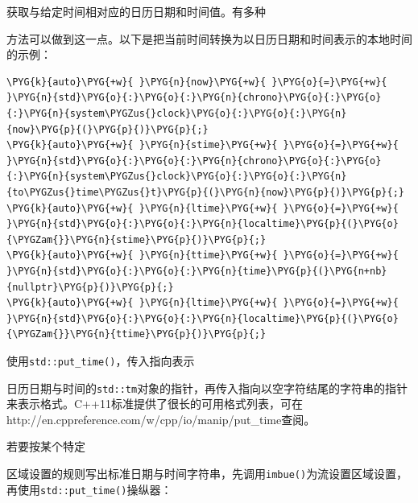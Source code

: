 
获取与给定时间相对应的日历日期和时间值。有多种



方法可以做到这一点。以下是把当前时间转换为以日历日期和时间表示的本地时间的示例：


\begin{codeblockbg}
\begin{Verbatim}[commandchars=\\\{\},breaklines=true,breakanywhere=true,fontsize=\codefont,xleftmargin=17bp]
\PYG{k}{auto}\PYG{+w}{ }\PYG{n}{now}\PYG{+w}{ }\PYG{o}{=}\PYG{+w}{ }\PYG{n}{std}\PYG{o}{:}\PYG{o}{:}\PYG{n}{chrono}\PYG{o}{:}\PYG{o}{:}\PYG{n}{system\PYGZus{}clock}\PYG{o}{:}\PYG{o}{:}\PYG{n}{now}\PYG{p}{(}\PYG{p}{)}\PYG{p}{;}
\PYG{k}{auto}\PYG{+w}{ }\PYG{n}{stime}\PYG{+w}{ }\PYG{o}{=}\PYG{+w}{ }\PYG{n}{std}\PYG{o}{:}\PYG{o}{:}\PYG{n}{chrono}\PYG{o}{:}\PYG{o}{:}\PYG{n}{system\PYGZus{}clock}\PYG{o}{:}\PYG{o}{:}\PYG{n}{to\PYGZus{}time\PYGZus{}t}\PYG{p}{(}\PYG{n}{now}\PYG{p}{)}\PYG{p}{;}
\PYG{k}{auto}\PYG{+w}{ }\PYG{n}{ltime}\PYG{+w}{ }\PYG{o}{=}\PYG{+w}{ }\PYG{n}{std}\PYG{o}{:}\PYG{o}{:}\PYG{n}{localtime}\PYG{p}{(}\PYG{o}{\PYGZam{}}\PYG{n}{stime}\PYG{p}{)}\PYG{p}{;}
\PYG{k}{auto}\PYG{+w}{ }\PYG{n}{ttime}\PYG{+w}{ }\PYG{o}{=}\PYG{+w}{ }\PYG{n}{std}\PYG{o}{:}\PYG{o}{:}\PYG{n}{time}\PYG{p}{(}\PYG{n+nb}{nullptr}\PYG{p}{)}\PYG{p}{;}
\PYG{k}{auto}\PYG{+w}{ }\PYG{n}{ltime}\PYG{+w}{ }\PYG{o}{=}\PYG{+w}{ }\PYG{n}{std}\PYG{o}{:}\PYG{o}{:}\PYG{n}{localtime}\PYG{p}{(}\PYG{o}{\PYGZam{}}\PYG{n}{ttime}\PYG{p}{)}\PYG{p}{;}
\end{Verbatim}
\end{codeblockbg}



使用\texttt{std::\allowbreak{}put\_\allowbreak{}time()}，传入指向表示



日历日期与时间的\texttt{std::\allowbreak{}tm}对象的指针，再传入指向以空字符结尾的字符串的指针来表示格式。C++11标准提供了很长的可用格式列表，可在http://\allowbreak{}en.\allowbreak{}cppreference.\allowbreak{}com/\allowbreak{}w/\allowbreak{}cpp/\allowbreak{}io/\allowbreak{}manip/\allowbreak{}put\_\allowbreak{}time查阅。



若要按某个特定



区域设置的规则写出标准日期与时间字符串，先调用\texttt{imbue()}为流设置区域设置，再使用\texttt{std::\allowbreak{}put\_\allowbreak{}time()}操纵器：


